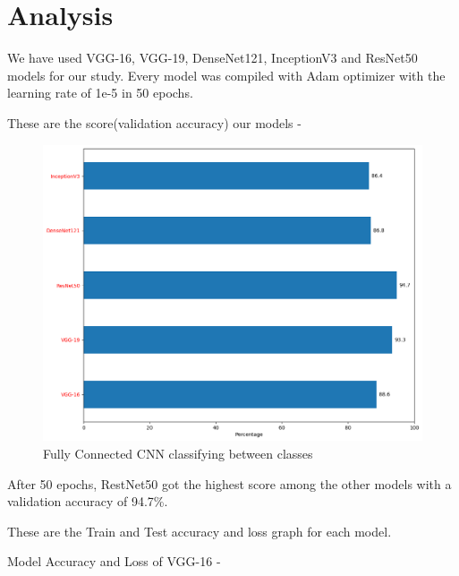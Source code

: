\section{Analysis}
We have used VGG-16, VGG-19, DenseNet121, InceptionV3 and ResNet50 models for our study. Every model was compiled with Adam optimizer with the learning rate of 1e-5 in 50 epochs. 

\noindent These are the score(validation accuracy) our models - 

\vspace{5mm}
\begin{figure}[hbt!]
\centering
\includegraphics[scale=0.5]{images/fig-24.png}
\caption{Fully Connected CNN classifying between classes}
\label{fig:x Fully Connected CNN classifying between classes.}
\end{figure}

\noindent After 50 epochs, RestNet50 got the highest score among the other models with a validation accuracy of 94.7\%.

\vspace{5mm}
\noindent These are the Train and Test accuracy and loss graph for each model.

\newpage
\vspace{5mm}
\noindent Model Accuracy and Loss of VGG-16 -

